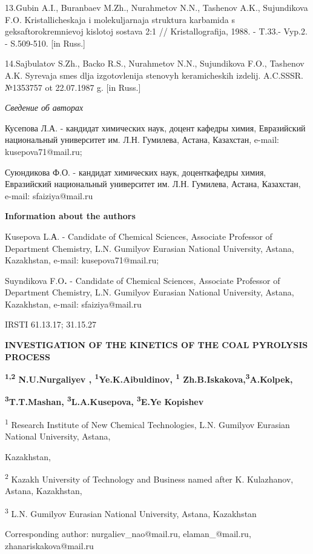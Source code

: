 13.Gubin A.I., Buranbaev M.Zh., Nurahmetov N.N., Tashenov A.K.,
Sujundikova F.O. Kristallicheskaja i molekuljarnaja struktura karbamida
s geksaftorokremnievoj kislotoj sostava 2:1 // Kristallografija, 1988. -
T.33.- Vyp.2. - S.509-510. {[}in Russ.{]}

14.Sajbulatov S.Zh., Backo R.S., Nurahmetov N.N., Sujundikova F.O.,
Tashenov A.K. Syr\textquotesingle evaja smes\textquotesingle{} dlja
izgotovlenija stenovyh keramicheskih izdelij. A.C.SSSR. №1353757 ot
22.07.1987 g. {[}in Russ.{]}

\emph{Сведение об авторах}

Кусепова Л.А. - кандидат химических наук, доцент кафедры химия,
Евразийский национальный университет им. Л.Н. Гумилева, Астана,
Казахстан, e-mail: kusepova71@mail.ru;

Суюндикова Ф.О. - кандидат химических наук, доценткафедры химия,
Евразийский национальный университет им. Л.Н. Гумилева, Астана,
Казахстан, e-mail: sfaiziya@mail.ru

\textbf{Information about the authors}

Kusepova L.А. - Candidate of Chemical Sciences, Associate Professor of
Department Chemistry, L.N. Gumilyov Eurasian National University,
Astana, Kazakhstan, e-mail: kusepova71@mail.ru;

Suyndikova F.O\textbf{.} - Candidate of Chemical Sciences, Associate
Professor of Department Chemistry, L.N. Gumilyov Eurasian National
University, Astana, Kazakhstan, e-mail: sfaiziya@mail.ru

IRSTI 61.13.17; 31.15.27

\textbf{INVESTIGATION OF THE KINETICS OF THE COAL PYROLYSIS PROCESS}

\textbf{\textsuperscript{1,2} N.U.Nurgaliyev ,
\textsuperscript{1}Ye.K.Aibuldinov, \textsuperscript{1}
Zh.B.Iskakova,\textsuperscript{3}A.Kolpek,}

\textbf{\textsuperscript{3}T.T.Mashan, \textsuperscript{3}L.A.Kusepova,
\textsuperscript{3}E.Ye Kopishev}

\textsuperscript{1} Research Institute of New Chemical Technologies,
L.N. Gumilyov Eurasian National University, Astana,

Kazakhstan,

\textsuperscript{2} Kazakh University of Technology and Business named
after K. Kulazhanov, Astana, Kazakhstan,

\textsuperscript{3} L.N. Gumilyov Eurasian National University, Astana,
Kazakhstan

Corresponding author: nurgaliev\_nao@mail.ru, elaman\_@mail.ru,
zhanariskakova@mail.ru

